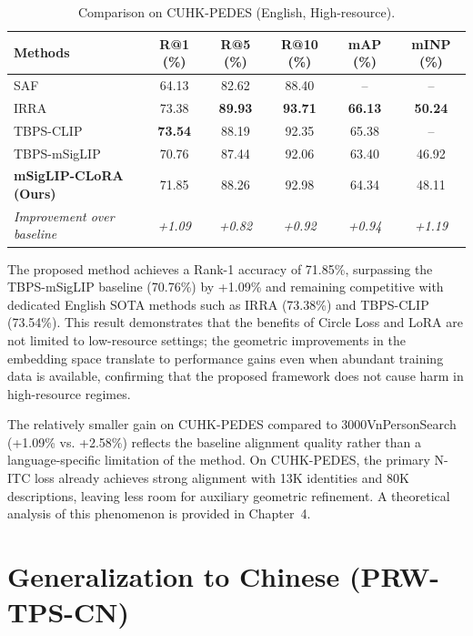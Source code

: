 \documentclass[../main.tex]{subfiles}
\begin{document}
\begin{table}[H]
\centering
\caption{Comparison on CUHK-PEDES (English, High-resource).}
\label{tab:comparison_cuhk}
\renewcommand{\arraystretch}{1.3}
\begin{tabularx}{\textwidth}{Xccccc}
\toprule
\textbf{Methods} & \textbf{R@1 (\%)} & \textbf{R@5 (\%)} & \textbf{R@10 (\%)} & \textbf{mAP (\%)} & \textbf{mINP (\%)} \\
\midrule
SAF & 64.13 & 82.62 & 88.40 & -- & -- \\
IRRA & 73.38 & \textbf{89.93} & \textbf{93.71} & \textbf{66.13} & \textbf{50.24} \\
TBPS-CLIP & \textbf{73.54} & 88.19 & 92.35 & 65.38 & -- \\
TBPS-mSigLIP & 70.76 & 87.44 & 92.06 & 63.40 & 46.92 \\
\textbf{mSigLIP-CLoRA (Ours)} & 71.85 & 88.26 & 92.98 & 64.34 & 48.11 \\
\midrule
\textit{Improvement over baseline} & \textit{+1.09} & \textit{+0.82} & \textit{+0.92} & \textit{+0.94} & \textit{+1.19} \\
\bottomrule
\end{tabularx}
\end{table}

\noindent The proposed method achieves a Rank-1 accuracy of 71.85\%, surpassing the TBPS-mSigLIP baseline (70.76\%) by +1.09\% and remaining competitive with dedicated English SOTA methods such as IRRA (73.38\%) and TBPS-CLIP (73.54\%). This result demonstrates that the benefits of Circle Loss and LoRA are not limited to low-resource settings; the geometric improvements in the embedding space translate to performance gains even when abundant training data is available, confirming that the proposed framework does not cause harm in high-resource regimes.

\noindent The relatively smaller gain on CUHK-PEDES compared to 3000VnPersonSearch (+1.09\% vs. +2.58\%) reflects the baseline alignment quality rather than a language-specific limitation of the method. On CUHK-PEDES, the primary N-ITC loss already achieves strong alignment with 13K identities and 80K descriptions, leaving less room for auxiliary geometric refinement. A theoretical analysis of this phenomenon is provided in Chapter~4.

\section{Generalization to Chinese (PRW-TPS-CN)}
\label{sec:prw_chinese}
\end{document}
